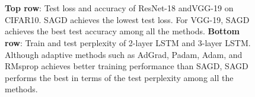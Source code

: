 \documentclass[11pt]{article}
\begin{document}
\begin{figure}[t]
\mbox{
\hspace{-0.5in}
 }
 
\vspace{-0.15in} 
 
 \mbox{
\hspace{-0.5in}
}
 \vspace{-0.1in}
 \caption[]{\textbf{Top row}: Test loss and accuracy of ResNet-18 andVGG-19 on CIFAR10. \textsc{SAGD} achieves the lowest test loss. For VGG-19, \textsc{SAGD} achieves the best test accuracy among all the methods.
\textbf{Bottom row}:  Train and test perplexity of 2-layer LSTM and 3-layer LSTM. 
 Although adaptive methods such as AdGrad, Padam, Adam, and RMsprop achieves better training performance than \textsc{SAGD}, \textsc{SAGD} performs the best in terms of the test perplexity among all the methods.
} 
 \label{fig:cifar10}\vspace{-0.05in}
\end{figure}
\end{document}
